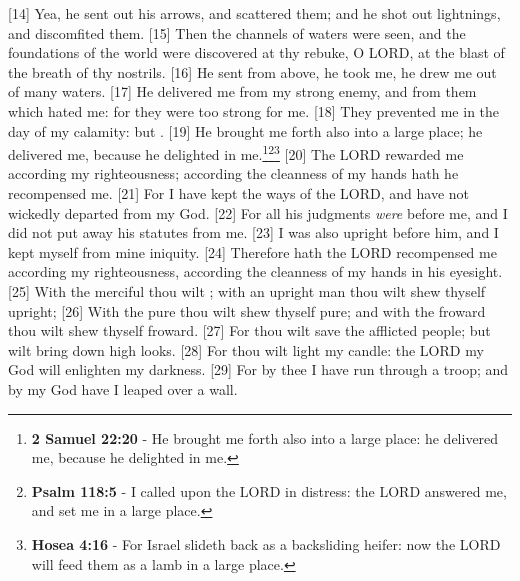 [14] \textcolor[cmyk]{0.99998,1,0,0}{Yea, he sent out his arrows, and scattered them; and he shot out lightnings, and discomfited them.}
[15] \textcolor[cmyk]{0.99998,1,0,0}{Then the channels of waters were seen, and the foundations of the world were discovered at thy rebuke, O LORD, at the blast of the breath of thy nostrils.}
[16] \textcolor[cmyk]{0.99998,1,0,0}{He sent from above, he took me, he drew me out of many waters.}
[17] \textcolor[cmyk]{0.99998,1,0,0}{He delivered me from my strong enemy, and from them which hated me: for they were too strong for me.}
[18] \textcolor[cmyk]{0.99998,1,0,0}{They prevented me in the day of my calamity: but .}
[19] \textcolor[cmyk]{0.99998,1,0,0}{He brought me forth also into a large place; he delivered me, because he delighted in me.}\footnote{\textbf{2 Samuel 22:20} - He brought me forth also into a large place: he delivered me, because he delighted in me.}\footnote{\textbf{Psalm 118:5} - I called upon the LORD in distress: the LORD answered me, and set me in a large place.}\footnote{\textbf{Hosea 4:16} - For Israel slideth back as a backsliding heifer: now the LORD will feed them as a lamb in a large place.}
[20] \textcolor[cmyk]{0.99998,1,0,0}{The LORD rewarded me according  my righteousness; according  the cleanness of my hands hath he recompensed me.}
[21] \textcolor[cmyk]{0.99998,1,0,0}{For I have kept the ways of the LORD, and have not wickedly departed from my God.}
[22] \textcolor[cmyk]{0.99998,1,0,0}{For all his judgments \emph{were} before me, and I did not put away his statutes from me.}
[23] \textcolor[cmyk]{0.99998,1,0,0}{I was also upright before him, and I kept myself from mine iniquity.}
[24] \textcolor[cmyk]{0.99998,1,0,0}{Therefore hath the LORD recompensed me according  my righteousness, according  the cleanness of my hands in his eyesight.}
[25] \textcolor[cmyk]{0.99998,1,0,0}{With the merciful thou wilt ; with an upright man thou wilt shew thyself upright;}
[26] \textcolor[cmyk]{0.99998,1,0,0}{With the pure thou wilt shew thyself pure; and with the froward thou wilt shew thyself froward.}
[27] \textcolor[cmyk]{0.99998,1,0,0}{For thou wilt save the afflicted people; but wilt bring down high looks.}
[28] \textcolor[cmyk]{0.99998,1,0,0}{For thou wilt light my candle: the LORD my God will enlighten my darkness.}
[29] \textcolor[cmyk]{0.99998,1,0,0}{For by thee I have run through a troop; and by my God have I leaped over a wall.}
